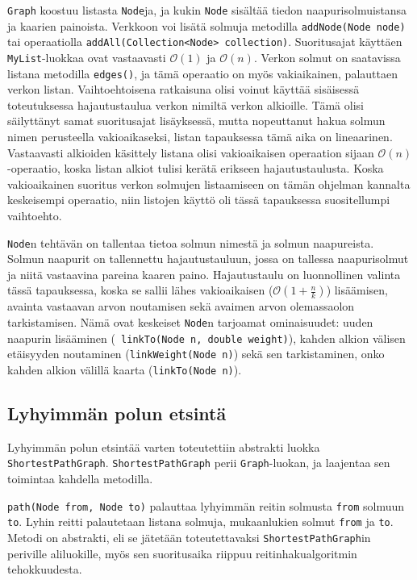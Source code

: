 \documentclass[10pt,a4paper]{article}
\begin{document}
\texttt{Graph} koostuu listasta \texttt{Node}ja, ja kukin \texttt{Node} sisältää tiedon naapurisolmuistansa ja kaarien painoista. Verkkoon voi lisätä solmuja metodilla \texttt{addNode(Node node)} tai operaatiolla \texttt{addAll(Collection<Node> collection)}. Suoritusajat käyttäen \texttt{MyList}-luokkaa ovat vastaavasti $\mathcal{O}(1)$ ja $\mathcal{O}(n)$. Verkon solmut on saatavissa listana metodilla \texttt{edges()}, ja tämä operaatio on myös vakiaikainen, palauttaen verkon listan. Vaihtoehtoisena ratkaisuna olisi voinut käyttää sisäisessä toteutuksessa hajautustaulua verkon nimiltä verkon alkioille. Tämä olisi säilyttänyt samat suoritusajat lisäyksessä, mutta nopeuttanut hakua solmun nimen perusteella vakioaikaseksi, listan tapauksessa tämä aika on lineaarinen. Vastaavasti alkioiden käsittely listana olisi vakioaikaisen operaation sijaan $\mathcal{O}(n)$-operaatio, koska listan alkiot tulisi kerätä erikseen hajautustaulusta. Koska vakioaikainen suoritus verkon solmujen listaamiseen on tämän ohjelman kannalta keskeisempi operaatio, niin listojen käyttö oli tässä tapauksessa suositellumpi vaihtoehto.

\texttt{Node}n tehtävän on tallentaa tietoa solmun nimestä ja solmun naapureista. Solmun naapurit on tallennettu hajautustauluun, jossa on tallessa naapurisolmut ja niitä vastaavina pareina kaaren paino. Hajautustaulu on luonnollinen valinta tässä tapauksessa, koska se sallii lähes vakioaikaisen ($\mathcal{O}(1 + \frac{n}{k})$) lisäämisen, avainta vastaavan arvon noutamisen sekä avaimen arvon olemassaolon tarkistamisen. Nämä ovat keskeiset \texttt{Node}n tarjoamat ominaisuudet: uuden naapurin lisääminen (\texttt{ linkTo(Node n, double weight)}), kahden alkion välisen etäisyyden noutaminen (\texttt{linkWeight(Node n)}) sekä sen tarkistaminen, onko kahden alkion välillä kaarta (\texttt{linkTo(Node n)}).

\subsection{Lyhyimmän polun etsintä}
\label{path}

Lyhyimmän polun etsintää varten toteutettiin abstrakti luokka \texttt{ShortestPathGraph}. \texttt{ShortestPathGraph} perii \texttt{Graph}-luokan, ja laajentaa sen toimintaa kahdella metodilla.

\texttt{path(Node from, Node to)} palauttaa lyhyimmän reitin solmusta \texttt{from} solmuun \texttt{to}. Lyhin reitti palautetaan listana solmuja, mukaanlukien solmut \texttt{from} ja \texttt{to}. Metodi on abstrakti, eli se jätetään toteutettavaksi \texttt{ShortestPathGraph}in  periville aliluokille, myös sen suoritusaika riippuu reitinhakualgoritmin tehokkuudesta.
\end{document}
